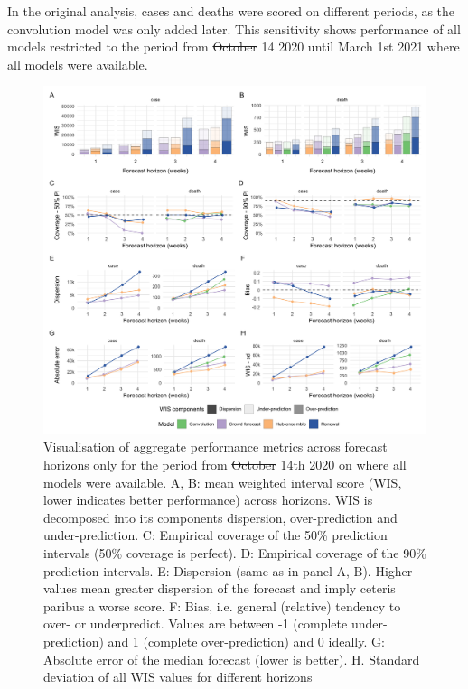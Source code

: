 \documentclass[10pt,letterpaper]{article} %
\providecommand{\DIFaddtex}[1]{{\protect\color{blue}\uwave{#1}}} %
\providecommand{\DIFdeltex}[1]{{\protect\color{red}\sout{#1}}}                      %
\providecommand{\DIFaddbegin}{} %
\providecommand{\DIFaddend}{} %
\providecommand{\DIFdelbegin}{} %
\providecommand{\DIFdelend}{} %
\providecommand{\DIFaddFL}[1]{\DIFadd{#1}} %
\providecommand{\DIFdelFL}[1]{\DIFdel{#1}} %
\providecommand{\DIFaddbeginFL}{} %
\providecommand{\DIFaddendFL}{} %
\providecommand{\DIFdelbeginFL}{} %
\providecommand{\DIFdelendFL}{} %
\providecommand{\DIFadd}[1]{\texorpdfstring{\DIFaddtex{#1}}{#1}} %
\providecommand{\DIFdel}[1]{\texorpdfstring{\DIFdeltex{#1}}{}} %
\newcommand{\DIFscaledelfig}{0.5}
\newlength{\DIFdelgraphicswidth} %
\newlength{\DIFdelgraphicsheight} %
\newcommand{\DIFaddincludegraphics}[2][]{{\color{blue}\fbox{\DIFOincludegraphics[#1]{#2}}}} %
\newcommand{\DIFdelincludegraphics}[2][]{%
\sbox{\DIFdelgraphicsbox}{\DIFOincludegraphics[#1]{#2}}%
\settoboxwidth{\DIFdelgraphicswidth}{\DIFdelgraphicsbox} %
\settoboxtotalheight{\DIFdelgraphicsheight}{\DIFdelgraphicsbox} %
\scalebox{\DIFscaledelfig}{%
\parbox[b]{\DIFdelgraphicswidth}{\usebox{\DIFdelgraphicsbox}\\[-\baselineskip] \rule{\DIFdelgraphicswidth}{0em}}\llap{\resizebox{\DIFdelgraphicswidth}{\DIFdelgraphicsheight}{%
\setlength{\unitlength}{\DIFdelgraphicswidth}%
\begin{picture}(1,1)%
\thicklines\linethickness{2pt} %
{\color[rgb]{1,0,0}\put(0,0){\framebox(1,1){}}}%
{\color[rgb]{1,0,0}\put(0,0){\line( 1,1){1}}}%
{\color[rgb]{1,0,0}\put(0,1){\line(1,-1){1}}}%
\end{picture}%
}\hspace*{3pt}}} %
} %
\DeclareRobustCommand{\DIFaddbegin}{\DIFOaddbegin \let\includegraphics\DIFaddincludegraphics} %
\DeclareRobustCommand{\DIFaddend}{\DIFOaddend \let\includegraphics\DIFOincludegraphics} %
\DeclareRobustCommand{\DIFdelbegin}{\DIFOdelbegin \let\includegraphics\DIFdelincludegraphics} %
\DeclareRobustCommand{\DIFdelend}{\DIFOaddend \let\includegraphics\DIFOincludegraphics} %
\DeclareRobustCommand{\DIFaddbeginFL}{\DIFOaddbeginFL \let\includegraphics\DIFaddincludegraphics} %
\DeclareRobustCommand{\DIFaddendFL}{\DIFOaddendFL \let\includegraphics\DIFOincludegraphics} %
\DeclareRobustCommand{\DIFdelbeginFL}{\DIFOdelbeginFL \let\includegraphics\DIFdelincludegraphics} %
\DeclareRobustCommand{\DIFdelendFL}{\DIFOaddendFL \let\includegraphics\DIFOincludegraphics} %
\begin{document}
In the original analysis, cases and deaths were scored on different
periods, as the convolution model was only added later. This sensitivity
shows performance of all models restricted to the period from \DIFdelbegin \DIFdel{October }\DIFdelend \DIFaddbegin \DIFadd{December
}\DIFaddend 14 2020 until March 1st 2021 where all models were available.

\begin{figure}[H]
\includegraphics[width=1\linewidth,]{../analysis/plots/aggregate-performance-all-late-period-v4} \caption{Visualisation of aggregate performance metrics across forecast horizons only for the period from \DIFdelbeginFL \DIFdelFL{October }\DIFdelendFL \DIFaddbeginFL \DIFaddFL{December }\DIFaddendFL 14th 2020 on where all models were available. A, B: mean weighted interval score (WIS, lower indicates better performance) across horizons. WIS is decomposed into its components dispersion, over-prediction and under-prediction. C: Empirical coverage of the 50\% prediction intervals (50\% coverage is perfect). D: Empirical coverage of the 90\% prediction intervals. E: Dispersion (same as in panel A, B). Higher values mean greater dispersion of the forecast and imply ceteris paribus a worse score. F: Bias, i.e. general (relative) tendency to over- or underpredict. Values are between -1 (complete under-prediction) and 1 (complete over-prediction) and 0 ideally. G: Absolute error of the median forecast (lower is better). H. Standard deviation of all WIS values for different horizons}\label{fig:agg-performance-all-late}
\end{figure}
\end{document}
